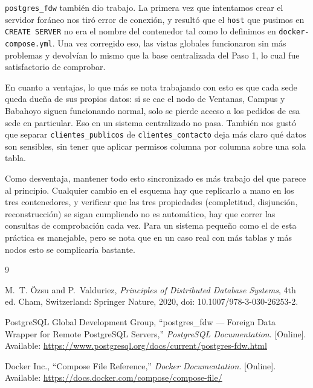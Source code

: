 \documentclass[10pt,a4paper]{article}
\begin{document}
\texttt{postgres\_fdw} también dio trabajo. La primera vez que intentamos
crear el servidor foráneo nos tiró error de conexión, y resultó que el
\texttt{host} que pusimos en \texttt{CREATE SERVER} no era el nombre del
contenedor tal como lo definimos en \texttt{docker-compose.yml}. Una vez
corregido eso, las vistas globales funcionaron sin más problemas y devolvían
lo mismo que la base centralizada del Paso 1, lo cual fue satisfactorio de
comprobar.

En cuanto a ventajas, lo que más se nota trabajando con esto es que cada
sede queda dueña de sus propios datos: si se cae el nodo de Ventanas, Campus
y Babahoyo siguen funcionando normal, solo se pierde acceso a los pedidos de
esa sede en particular. Eso en un sistema centralizado no pasa. También nos
gustó que separar \texttt{clientes\_publicos} de \texttt{clientes\_contacto}
deja más claro qué datos son sensibles, sin tener que aplicar permisos
columna por columna sobre una sola tabla.

Como desventaja, mantener todo esto sincronizado es más trabajo del que
parece al principio. Cualquier cambio en el esquema hay que replicarlo a
mano en los tres contenedores, y verificar que las tres propiedades
(completitud, disjunción, reconstrucción) se sigan cumpliendo no es
automático, hay que correr las consultas de comprobación cada vez. Para un
sistema pequeño como el de esta práctica es manejable, pero se nota que en
un caso real con más tablas y más nodos esto se complicaría bastante.

\begin{thebibliography}{9}

M.~T. Özsu and P.~Valduriez, \emph{Principles of Distributed Database
Systems}, 4th ed. Cham, Switzerland: Springer Nature, 2020, doi:
10.1007/978-3-030-26253-2.

PostgreSQL Global Development Group, ``postgres\_fdw --- Foreign Data
Wrapper for Remote PostgreSQL Servers,'' \emph{PostgreSQL Documentation}.
[Online]. Available: \url{https://www.postgresql.org/docs/current/postgres-fdw.html}

Docker Inc., ``Compose File Reference,'' \emph{Docker Documentation}.
[Online]. Available: \url{https://docs.docker.com/compose/compose-file/}

\end{thebibliography}
\end{document}
